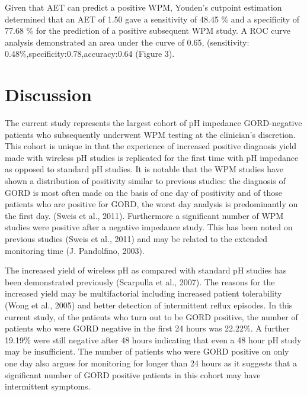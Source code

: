 \documentclass[english,man,floatsintext]{apa6}
\begin{document}
Given that AET can predict a positive WPM, Youden's cutpoint estimation determined that an AET of 1.50 gave a sensitivity of 48.45 \% and a specificity of 77.68 \% for the prediction of a positive subsequent WPM study. A ROC curve analysis demonstrated an area under the curve of 0.65, (sensitivity: 0.48\%,specificity:0.78,accuracy:0.64 (Figure 3).

\hypertarget{discussion}{%
\section{Discussion}\label{discussion}}

The current study represents the largest cohort of pH impedance GORD-negative patients who subsequently underwent WPM testing at the clinician's discretion. This cohort is unique in that the experience of increased positive diagnosis yield made with wireless pH studies is replicated for the first time with pH impedance as opposed to standard pH studies. It is notable that the WPM studies have shown a distribution of positivity similar to previous studies: the diagnosis of GORD is most often made on the basis of one day of positivity and of those patients who are positive for GORD, the worst day analysis is predominantly on the first day. (Sweis et al., 2011). Furthermore a significant number of WPM studies were positive after a negative impedance study. This has been noted on previous studies (Sweis et al., 2011) and may be related to the extended monitoring time (J. Pandolfino, 2003).

The increased yield of wireless pH as compared with standard pH studies has been demonstrated previously (Scarpulla et al., 2007). The reasons for the increased yield may be multifactorial including increased patient tolerability (Wong et al., 2005) and better detection of intermittent reflux episodes. In this current study, of the patients who turn out to be GORD positive, the number of patients who were GORD negative in the first 24 hours was 22.22\%. A further 19.19\% were still negative after 48 hours indicating that even a 48 hour pH study may be insufficient. The number of patients who were GORD positive on only one day also argues for monitoring for longer than 24 hours as it suggests that a significant number of GORD positive patients in this cohort may have intermittent symptoms.
\end{document}

